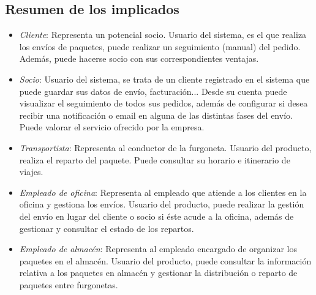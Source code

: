	\subsection{Resumen de los implicados}
	\begin{itemize}
		\item \textit{Cliente}: Representa un potencial socio. Usuario del sistema, es el que realiza los envíos de paquetes, puede realizar un seguimiento (manual) del pedido. Además, puede hacerse socio con sus correspondientes ventajas.
		\item \textit{Socio}: Usuario del sistema, se trata de un cliente registrado en el sistema que puede guardar sus datos de envío, facturación... Desde su cuenta puede visualizar el seguimiento de todos sus pedidos, además de configurar si desea recibir una notificación o email en alguna de las distintas fases del envío. Puede valorar el servicio ofrecido por la empresa.
		\item \textit{Transportista}: Representa al conductor de la furgoneta. Usuario del producto, realiza el reparto del paquete. Puede consultar su horario e itinerario de viajes.
		\item \textit{Empleado de oficina}: Representa al empleado que atiende a los clientes en la oficina y gestiona los envíos. Usuario del producto, puede realizar la gestión del envío en lugar del cliente o socio si éste acude a la oficina, además de gestionar y consultar el estado de los repartos.
		\item \textit{Empleado de almacén}: Representa al empleado encargado de organizar los paquetes en el almacén. Usuario del producto, puede consultar la información relativa a los paquetes en almacén y gestionar la distribución o reparto de paquetes entre furgonetas. \\ \\
	\end{itemize}
	
